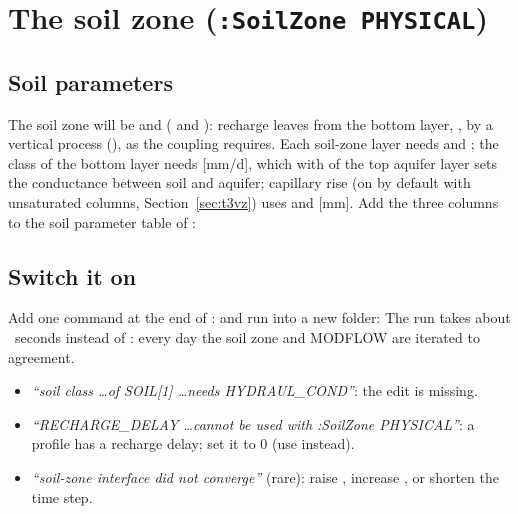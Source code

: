 \section{The soil zone (\texttt{:SoilZone PHYSICAL})}
\subsection{Soil parameters}
The soil zone will be  and  ( and ): recharge leaves from the bottom layer,
, by a vertical process (), as the coupling requires. Each soil-zone
layer needs  and ; the class of the bottom layer needs  [mm/d], which with
 of the top aquifer layer sets the conductance between soil and aquifer; capillary rise (on by default with
unsaturated columns, Section~\ref{sec:t3vz}) uses  and  [mm]. Add the three columns
to the soil parameter table of :

\subsection{Switch it on}
Add one command at the end of :
and run into a new folder:
The run takes about ~seconds instead of : every day the soil zone and MODFLOW are
iterated to agreement.
\begin{trouble}
\begin{itemize}
\item \emph{``soil class \dots of SOIL[1] \dots needs HYDRAUL\_COND''}: the  edit is missing.
\item \emph{``RECHARGE\_DELAY \dots cannot be used with :SoilZone PHYSICAL''}: a profile has a recharge delay; set it to 0 (use
       instead).
\item \emph{``soil-zone interface did not converge''} (rare): raise , increase
      , or shorten the time step.
\end{itemize}
\end{trouble}

